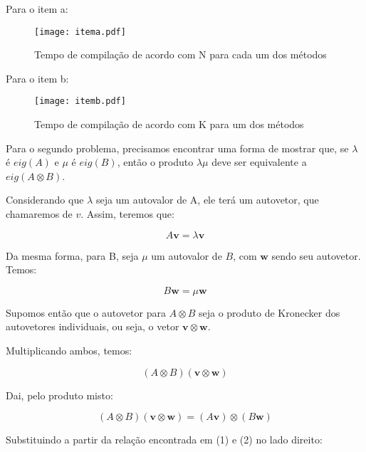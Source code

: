 	Para o item a:
	
	\begin{figure}[!h]
		\centering
		\texttt{[image: itema.pdf]}
		\caption{Tempo de compilação de acordo com N para cada um dos métodos}
		\label{fig:placeholder}
	\end{figure}
	
	Para o item b: 
	
	\begin{figure}[!h]
		\centering
		\texttt{[image: itemb.pdf]}
		\caption{Tempo de compilação de acordo com K para um dos métodos}
		\label{fig:placeholder}
	\end{figure}
	
	\newpage
	
	Para o segundo problema, precisamos encontrar uma forma de mostrar que, se $\lambda$ é $eig(A)$ e $\mu$ é $eig(B)$, então o produto $\lambda\mu$ deve ser equivalente a $eig(A \otimes B)$.
	
	Considerando que $\lambda$ seja um autovalor de A, ele terá um autovetor, que chamaremos de $v$. Assim, teremos que: 
	
	\begin{equation}
		A\mathbf{v} = \lambda \mathbf{v}    
	\end{equation}
	
	Da mesma forma, para B, seja $\mu$ um autovalor de $B$, com $\mathbf{w}$ sendo seu autovetor. Temos:
	
	
	\begin{equation}
		B\mathbf{w} = \mu \mathbf{w}
	\end{equation}
	
	
	Supomos então que o autovetor para $A \otimes B$ seja o produto de Kronecker dos autovetores individuais, ou seja, o vetor $\mathbf{v} \otimes \mathbf{w}$.
	
	Multiplicando ambos, temos: 
	
	
	\begin{equation}
		(A \otimes B)(\mathbf{v} \otimes \mathbf{w})
	\end{equation}
	
	Dai, pelo produto misto:
	
	\begin{equation}
		(A \otimes B)(\mathbf{v} \otimes \mathbf{w}) = (A\mathbf{v}) \otimes (B\mathbf{w})
	\end{equation}
	
	Substituindo a partir da relação encontrada em (1) e (2) no lado direito:
	
